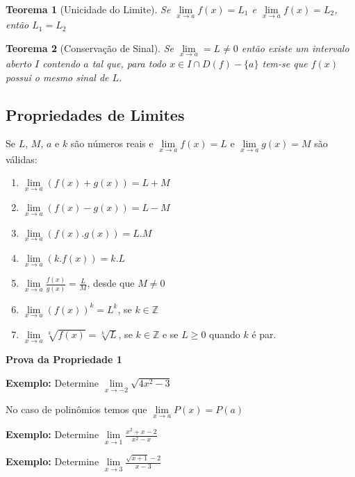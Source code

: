 \documentclass[oneside,a4paper,12pt]{article}
\newtheorem{theorem}{Teorema}[section]
\begin{document}
\begin{theorem}[Unicidade do Limite]
	Se $\lim\limits_{x \rightarrow a}f(x) = L_1$ e $\lim\limits_{x \rightarrow a}f(x) = L_2$, então $L_1 = L_2$
\end{theorem}

\begin{theorem}[Conservação de Sinal]
	Se $\lim\limits_{x \rightarrow a} = L \neq 0$ então existe um intervalo aberto $I$ contendo $a$ tal que, para todo $x \in I \cap D(f)-\{a\}$ tem-se que $f(x)$ possui o mesmo sinal de $L$.
\end{theorem}

\subsection{Propriedades de Limites}
Se $L$, $M$, $a$ e $k$ são números reais e $\lim\limits_{x \rightarrow a}f(x) = L$ e $\lim\limits_{x \rightarrow a}g(x) = M$ são válidas:
\begin{enumerate}
	\item $\lim\limits_{x \rightarrow a}(f(x) + g(x)) = L + M$
	\item $\lim\limits_{x \rightarrow a}(f(x) - g(x)) = L - M$
	\item $\lim\limits_{x \rightarrow a}(f(x) . g(x)) = L . M$
	\item $\lim\limits_{x \rightarrow a}(k.f(x)) = k.L$
	\item $\lim\limits_{x \rightarrow a}\frac{f(x)}{g(x)} = \frac{L}{M}$, desde que $M \neq 0$
	\item $\lim\limits_{x \rightarrow a}(f(x))^{k} = L^k$, se $k \in \mathbb{Z}$
	\item $\lim\limits_{x \rightarrow a}\sqrt[k]{f(x)} = \sqrt[k]{L}$, se $k \in \mathbb{Z}$ e se $L \geq 0$ quando $k$ é par.
\end{enumerate}

{\bf Prova da Propriedade 1}
\newpage

{\bf Exemplo:} Determine $\lim\limits_{x \rightarrow -2}\sqrt{4x^{2}-3}$

\vspace{250pt}

No caso de polinômios temos que $\lim\limits_{x \rightarrow a}P(x) = P(a)$

{\bf Exemplo: } Determine $\lim\limits_{x \rightarrow 1}\frac{x^2+x-2}{x^2-x}$
\vspace{250pt}

{\bf Exemplo: } Determine $\lim\limits_{x \rightarrow 3}\frac{\sqrt{x+1} - 2}{x-3}$
\vspace{250pt}
\newpage
\end{document}
